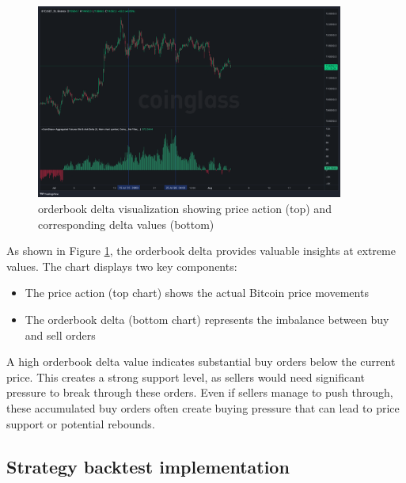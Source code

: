\documentclass[12pt]{article}
\begin{document}
\begin{figure}[h]
    \centering
    \includegraphics[width=0.9\textwidth]{imgs/showcase_chart.png}
    \caption{orderbook delta visualization showing price action (top) and corresponding delta values (bottom)}
    \label{fig:orderbook_delta}
\end{figure}




As shown in Figure \ref{fig:orderbook_delta}, the orderbook delta provides valuable insights at extreme values. The chart displays two key components:
\begin{itemize}
    \item The price action (top chart) shows the actual Bitcoin price movements
    \item The orderbook delta (bottom chart) represents the imbalance between buy and sell orders
\end{itemize}

A high orderbook delta value indicates substantial buy orders below the current price. This creates a strong support level, as sellers would need significant pressure to break through these orders. Even if sellers manage to push through, these accumulated buy orders often create buying pressure that can lead to price support or potential rebounds.
















\newpage
\subsection*{Strategy backtest implementation}
\end{document}

